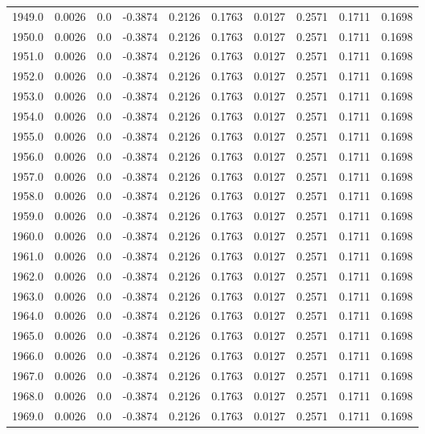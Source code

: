 \begin{longtable}{lrrrrrrrrr}
1949.0 & 0.0026 & 0.0 & -0.3874 & 0.2126 & 0.1763 & 0.0127 & 0.2571 & 0.1711 & 0.1698 \\
1950.0 & 0.0026 & 0.0 & -0.3874 & 0.2126 & 0.1763 & 0.0127 & 0.2571 & 0.1711 & 0.1698 \\
1951.0 & 0.0026 & 0.0 & -0.3874 & 0.2126 & 0.1763 & 0.0127 & 0.2571 & 0.1711 & 0.1698 \\
1952.0 & 0.0026 & 0.0 & -0.3874 & 0.2126 & 0.1763 & 0.0127 & 0.2571 & 0.1711 & 0.1698 \\
1953.0 & 0.0026 & 0.0 & -0.3874 & 0.2126 & 0.1763 & 0.0127 & 0.2571 & 0.1711 & 0.1698 \\
1954.0 & 0.0026 & 0.0 & -0.3874 & 0.2126 & 0.1763 & 0.0127 & 0.2571 & 0.1711 & 0.1698 \\
1955.0 & 0.0026 & 0.0 & -0.3874 & 0.2126 & 0.1763 & 0.0127 & 0.2571 & 0.1711 & 0.1698 \\
1956.0 & 0.0026 & 0.0 & -0.3874 & 0.2126 & 0.1763 & 0.0127 & 0.2571 & 0.1711 & 0.1698 \\
1957.0 & 0.0026 & 0.0 & -0.3874 & 0.2126 & 0.1763 & 0.0127 & 0.2571 & 0.1711 & 0.1698 \\
1958.0 & 0.0026 & 0.0 & -0.3874 & 0.2126 & 0.1763 & 0.0127 & 0.2571 & 0.1711 & 0.1698 \\
1959.0 & 0.0026 & 0.0 & -0.3874 & 0.2126 & 0.1763 & 0.0127 & 0.2571 & 0.1711 & 0.1698 \\
1960.0 & 0.0026 & 0.0 & -0.3874 & 0.2126 & 0.1763 & 0.0127 & 0.2571 & 0.1711 & 0.1698 \\
1961.0 & 0.0026 & 0.0 & -0.3874 & 0.2126 & 0.1763 & 0.0127 & 0.2571 & 0.1711 & 0.1698 \\
1962.0 & 0.0026 & 0.0 & -0.3874 & 0.2126 & 0.1763 & 0.0127 & 0.2571 & 0.1711 & 0.1698 \\
1963.0 & 0.0026 & 0.0 & -0.3874 & 0.2126 & 0.1763 & 0.0127 & 0.2571 & 0.1711 & 0.1698 \\
1964.0 & 0.0026 & 0.0 & -0.3874 & 0.2126 & 0.1763 & 0.0127 & 0.2571 & 0.1711 & 0.1698 \\
1965.0 & 0.0026 & 0.0 & -0.3874 & 0.2126 & 0.1763 & 0.0127 & 0.2571 & 0.1711 & 0.1698 \\
1966.0 & 0.0026 & 0.0 & -0.3874 & 0.2126 & 0.1763 & 0.0127 & 0.2571 & 0.1711 & 0.1698 \\
1967.0 & 0.0026 & 0.0 & -0.3874 & 0.2126 & 0.1763 & 0.0127 & 0.2571 & 0.1711 & 0.1698 \\
1968.0 & 0.0026 & 0.0 & -0.3874 & 0.2126 & 0.1763 & 0.0127 & 0.2571 & 0.1711 & 0.1698 \\
1969.0 & 0.0026 & 0.0 & -0.3874 & 0.2126 & 0.1763 & 0.0127 & 0.2571 & 0.1711 & 0.1698 \\

\end{longtable}
